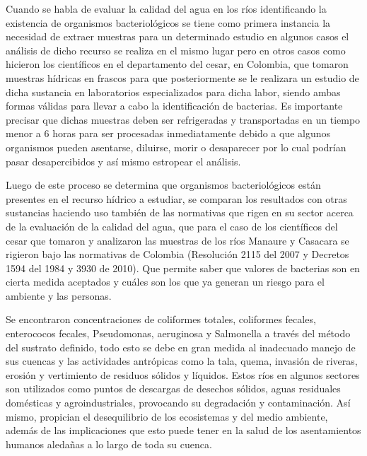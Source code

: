 Cuando se habla de evaluar la calidad del agua en los ríos identificando la existencia de organismos bacteriológicos se tiene como primera instancia la necesidad de extraer muestras para un determinado estudio en algunos casos el análisis de dicho recurso se realiza en el mismo lugar pero en otros casos como hicieron los científicos en el departamento del cesar, en Colombia, que tomaron muestras hídricas en frascos para que posteriormente se le realizara un estudio de dicha sustancia en laboratorios especializados para dicha labor, siendo ambas formas válidas para llevar a cabo la identificación de bacterias. Es importante precisar que dichas muestras deben ser refrigeradas y transportadas en un tiempo menor a 6 horas para ser procesadas inmediatamente debido a que algunos organismos pueden asentarse, diluirse, morir o desaparecer por lo cual podrían pasar desapercibidos y así mismo estropear el análisis.

Luego de este proceso se determina que organismos bacteriológicos están presentes en el recurso hídrico a estudiar, se comparan los resultados con otras sustancias haciendo uso también de las normativas que rigen en su sector acerca de la evaluación de la calidad del agua, que para el caso de los científicos del cesar que tomaron y analizaron las muestras de los ríos Manaure y Casacara se rigieron bajo las normativas de Colombia (Resolución 2115 del 2007 y Decretos 1594 del 1984 y 3930 de 2010). Que permite saber que valores de bacterias son en cierta medida aceptados y cuáles son los que ya generan un riesgo para el ambiente y las personas.

Se encontraron concentraciones de coliformes totales, coliformes fecales, enterococos fecales, Pseudomonas, aeruginosa y Salmonella a través del método del sustrato definido, todo esto se debe en gran medida al inadecuado manejo de sus cuencas y las actividades antrópicas como la tala, quema, invasión de riveras, erosión y vertimiento de residuos sólidos y líquidos. Estos ríos en algunos sectores son utilizados como puntos de descargas de desechos sólidos, aguas residuales domésticas y agroindustriales, provocando su degradación y contaminación. Así mismo, propician el desequilibrio de los ecosistemas y del medio ambiente, además de las implicaciones que esto puede tener en la salud de los asentamientos humanos aledañas a lo largo de toda su cuenca.

